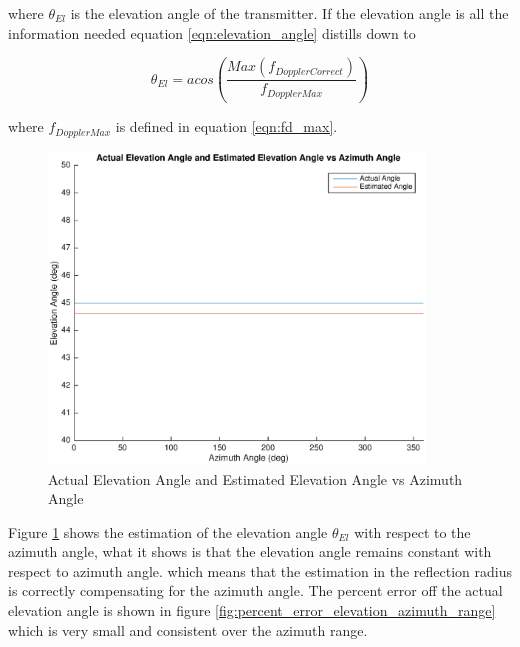 where $\theta_{El}$ is the elevation angle of the transmitter. If the elevation angle is all the information needed equation \ref{eqn:elevation_angle} distills down to

\begin{equation}
	\theta_{El} = acos\left(\frac{Max(f_{DopplerCorrect})}{f_{DopplerMax}}\right)
	\label{eqn:elevation_angle_only}
\end{equation}

where $f_{DopplerMax}$ is defined in equation \ref{eqn:fd_max}.

\begin{figure}
	\begin{center}
		\includegraphics[width=10cm]{images/results/Elevation_angle_comparason_Azimuth_range.eps}
		\caption{Actual Elevation Angle and Estimated Elevation Angle vs Azimuth Angle}
		\label{fig:elevation_comparason_azimuth_range}
	\end{center}
\end{figure}

Figure \ref{fig:elevation_comparason_azimuth_range} shows the estimation of the elevation angle $\theta_{El}$ with respect to the azimuth angle, what it shows is that the elevation angle remains constant with respect to azimuth angle. which means that the estimation in the reflection radius is correctly compensating for the azimuth angle. The percent error off the actual elevation angle is shown in figure \ref{fig:percent_error_elevation_azimuth_range} which is very small and consistent over the azimuth range.

